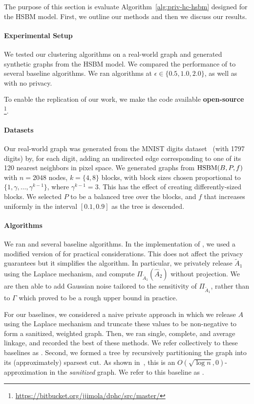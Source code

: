 The purpose of this section is evaluate Algorithm~\ref{alg:priv-hc-hsbm} designed for the HSBM model. First, we outline our methods and then we discuss our results.

\paragraph{Experimental Setup}
We tested our clustering algorithms on a real-world graph and generated synthetic graphs from the HSBM model. We compared the performance of \dphchsbm{} to several baseline algorithms.
We ran algorithms at $\epsilon \in \{0.5, 1.0, 2.0\}$, as well as with no privacy.

To enable the replication of our work, we make the code available {\bf open-source} \footnote{\url{https://bitbucket.org/jjimola/dphc/src/master/}}.

\paragraph{Datasets} Our real-world graph was generated from the MNIST digits dataset~\citep{lecun1998mnist} (with 1797 digits) by, for each digit, adding an undirected edge corresponding to one of its 120 nearest neighbors in pixel space. We generated graphs from $\textnormal{HSBM}(B, P, f)$ with $n=2048$ nodes, $k = \{4, 8\}$ blocks, with block sizes chosen proportional to $\{1, \gamma, \ldots, \gamma^{k-1}\}$, where $\gamma^{k-1} = 3$. This has the effect of creating differently-sized blocks. We selected $P$ to be a balanced tree over the blocks, and $f$ that increases uniformly in the interval $[0.1, 0.9]$ as the tree is descended. 

\paragraph{Algorithms} We ran \dphchsbm{} and several baseline algorithms. In the implementation of \dphchsbm{}, we used a modified version of \dpcom{} for practical considerations. This does not affect the privacy guarantees but it simplifies the algorithm. In particular, we privately release $\tilde{A}_1$ using the Laplace mechanism, and compute $\Pi_{\tilde{A}_1}(\hat{A}_2)$ without projection. We are then able to add Gaussian noise tailored to the sensitivity of $\Pi_{\tilde{A}_1}$, rather than to $\Gamma$ which proved to be a rough upper bound in practice.

For our baselines, we considered a naive private approach in which we release $A$ using the Laplace mechanism and truncate these values to be non-negative to form a sanitized, weighted graph. Then, we ran single, complete, and average linkage, and recorded the best of these methods. We refer collectively to these baselines as \linkage{}. Second, we formed a tree by recursively partitioning the graph into its (approximately) sparsest cut. As shown in~\citet{charikar2017approximate}, this is an $O(\sqrt{\log n}, 0)$-approximation in the \textit{sanitized} graph. We refer to this baseline as \sparsecut{}.

